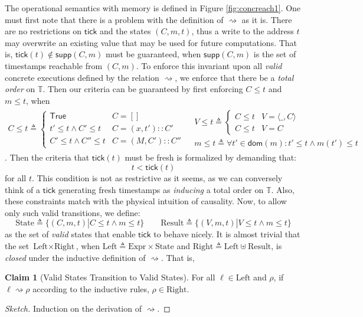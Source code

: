 \documentclass{article}
\theoremstyle{definition}
\newtheorem{clm}{Claim}[section]
\newcommand*{\cons}{::}
\newcommand*{\Expr}{\text{Expr}}
\newcommand*{\Time}{\mathbb{T}}
\newcommand*{\Left}{\text{Left}}
\newcommand*{\Right}{\text{Right}}
\newcommand*{\mem}{m}
\newcommand*{\State}{\text{State}}
\newcommand*{\Result}{\text{Result}}
\newcommand*{\semarrow}{\rightsquigarrow}
\newcommand*{\tick}{\mathsf{tick}}
\begin{document}
The operational semantics with memory is defined in Figure \ref{fig:concreach1}.
One must first note that there is a problem with the definition of $\semarrow$ as it is.
There are no restrictions on $\tick$ and the states $(C,\mem,t)$, thus a write to the address $t$ may overwrite an existing value that may be used for future computations.
That is, $\tick(t)\not\in\mathsf{supp}(C,\mem)$ must be guaranteed, when $\mathsf{supp}(C,\mem)$ is the set of timestamps reachable from $(C,\mem)$.
To enforce this invariant upon all \emph{valid} concrete executions defined by the relation $\semarrow$, we enforce that there be a \emph{total order} on $\Time$.
Then our criteria can be guaranteed by first enforcing $C\le t$ and $\mem\le t$, when
\[
  \begin{array}{cc}
    C \le  t\triangleq
    \begin{cases}
      \mathsf{True}              & C=[]              \\
      t' \le  t\wedge C' \le  t  & C=(x,t')\cons C'  \\
      C' \le  t\wedge C'' \le  t & C=(M,C')\cons C''
    \end{cases}
     &
    \begin{array}{l}
      V \le  t\triangleq
      \begin{cases}
        C \le  t & V=\langle\_,C\rangle \\
        C \le  t & V=C
      \end{cases} \\
      \mem \le  t\triangleq\forall t'\in\mathsf{dom}(\mem):t'\le t\wedge\mem(t') \le  t
    \end{array}
  \end{array}
\]
. Then the criteria that $\tick(t)$ must be fresh is formalized by demanding that:
\[t < \tick(t)\]
for all $t$.
This condition is not as restrictive as it seems, as we can conversely think of a $\tick$ generating fresh timestamps as \emph{inducing} a total order on $\Time$.
Also, these constraints match with the physical intuition of causality.
Now, to allow only such valid transitions, we define:
\[
  \State\triangleq\{(C,\mem,t)|C\le t\wedge\mem\le t\}\qquad
  \Result\triangleq\{(V,\mem,t)|V\le t\wedge\mem\le t\}
\]
as the set of \emph{valid} states that enable $\tick$ to behave nicely.
It is almost trivial that the set $\Left\times\Right$, when $\Left\triangleq\Expr\times\State$ and $\Right\triangleq\Left\uplus\Result$, is \emph{closed} under the inductive definition of $\semarrow$.
That is,
\begin{clm}[Valid States Transition to Valid States]
  For all $\ell\in\Left$ and $\rho$, if $\ell\semarrow\rho$ according to the inductive rules, $\rho\in\Right$.
\end{clm}
\begin{proof}[Sketch]
  Induction on the derivation of $\semarrow$.
\end{proof}
\end{document}
